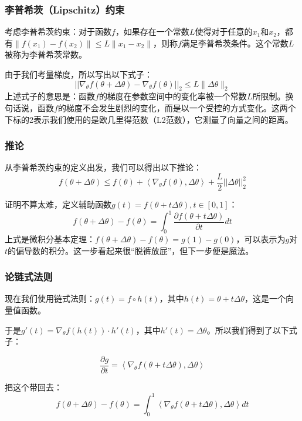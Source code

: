 \documentclass{ctexbeamer}
\begin{document}
\begin{frame}
    \frametitle{李普希茨（Lipschitz）约束}

    考虑李普希茨约束：对于函数$f$，如果存在一个常数$L$使得对于任意的$x_1$和$x_2$，都有$\|f(x_1) - f(x_2)\| \leq L \|x_1 - x_2\|$，则称$f$满足李普希茨条件。这个常数$L$被称为李普希茨常数。
    
    由于我们考量梯度，所以写出以下式子：
    \begin{equation}\label{eq:lip1}
        \left|\left|\nabla_\theta f(\theta + \Delta \theta) - \nabla_\theta f(\theta)\right|\right|_2 \leqslant L \|\Delta \theta\|_2
    \end{equation}
    上述式子的意思是：函数$f$的梯度在参数空间中的变化率被一个常数$L$所限制。换句话说，函数$f$的梯度不会发生剧烈的变化，而是以一个受控的方式变化。这两个下标的2表示我们使用的是欧几里得范数（L2范数），它测量了向量之间的距离。

\end{frame}

\begin{frame}
    \frametitle{推论}

    从李普希茨约束的定义出发，我们可以得出以下推论：
    \begin{equation}\label{eq:lip2}
        f(\theta + \Delta \theta) \leqslant f(\theta) + \left\langle \nabla_\theta f(\theta), \Delta \theta \right\rangle + \frac{L}{2} \left|\left|\Delta \theta\right|\right|_2^2
    \end{equation}

    证明不算太难，定义辅助函数$g(t) = f(\theta + t \Delta \theta), t \in [0, 1]$：
    \begin{equation}
        f(\theta + \Delta \theta) - f(\theta) = \int_0^1 \frac{\partial f(\theta + t \Delta \theta)}{\partial t} dt
    \end{equation}
    上式是微积分基本定理：$f(\theta + \Delta \theta) - f(\theta)=g(1)-g(0)$，可以表示为$g$对$t$的偏导数的积分。这一步看起来很“脱裤放屁”，但下一步便是魔法。

\end{frame}

\begin{frame}
    \frametitle{论链式法则}

    现在我们使用链式法则：$g(t) = f \circ h(t)$，其中$h(t) = \theta + t \Delta \theta$，这是一个向量值函数。
    
    于是$g'(t) = \nabla_\theta f(h(t)) \cdot h'(t)$，其中$h'(t) = \Delta \theta$。所以我们得到了以下式子：

    \begin{equation}
        \frac{\partial g}{\partial t} = \left\langle \nabla_\theta f(\theta + t \Delta \theta), \Delta \theta \right\rangle
    \end{equation}

    把这个带回去：
    \begin{equation}
        f(\theta + \Delta \theta) - f(\theta) = \int_0^1 \left\langle \nabla_\theta f(\theta + t \Delta \theta), \Delta \theta \right\rangle dt
    \end{equation}

\end{frame}
\end{document}
